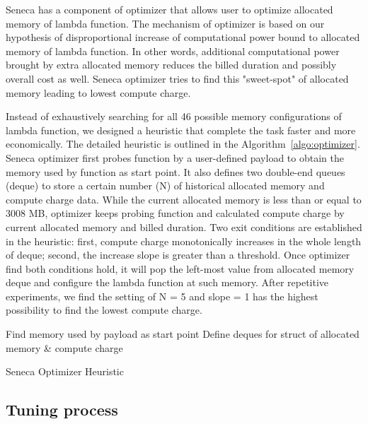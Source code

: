 Seneca has a component of optimizer that allows user to optimize allocated memory of lambda function. The mechanism of optimizer is based on our hypothesis of disproportional increase of computational power bound to allocated memory of lambda function. In other words, additional computational power brought by extra allocated memory reduces the billed duration and possibly overall cost as well. Seneca optimizer tries to find this "sweet-spot" of allocated memory leading to lowest compute charge.

Instead of exhaustively searching for all 46 possible memory configurations of lambda function, we designed a heuristic that complete the task faster and more economically. The detailed heuristic is outlined in the Algorithm~\ref{algo:optimizer}. Seneca optimizer first probes function by a user-defined payload to obtain the memory used by function as start point. It also defines two double-end queues (deque) to store a certain number (N) of historical allocated memory and compute charge data. While the current allocated memory is less than or equal to 3008 MB, optimizer keeps probing function and calculated compute charge by current allocated memory and billed duration. Two exit conditions are established in the heuristic: first, compute charge monotonically increases in the whole length of deque; second, the increase slope is greater than a threshold. Once optimizer find both conditions hold, it will pop the left-most value from allocated memory deque and configure the lambda function at such memory. After repetitive experiments, we find the setting of N = 5 and slope = 1 has the highest possibility to find the lowest compute charge.

\begin{algorithm}[]
\SetAlgoLined
{}
Find memory used by payload as start point\;
Define deques for struct of allocated memory \& compute charge\;
 \caption{Seneca Optimizer Heuristic}
 \label{algo:optimizer}
\end{algorithm}

\subsection{Tuning process}

